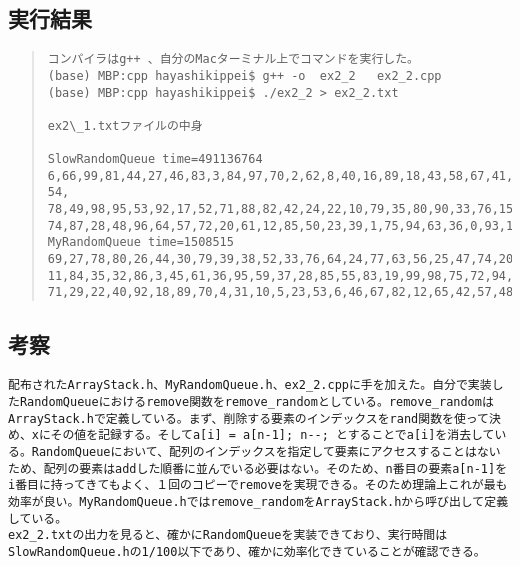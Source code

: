 \documentclass[11pt,a4paper]{jsarticle}
\begin{document}
\subsection{実行結果}
\begin{quote}           %
\begin{verbatim}
コンパイラはg++ 、自分のMacターミナル上でコマンドを実行した。
(base) MBP:cpp hayashikippei$ g++ -o  ex2_2   ex2_2.cpp
(base) MBP:cpp hayashikippei$ ./ex2_2 > ex2_2.txt

ex2\_1.txtファイルの中身

SlowRandomQueue time=491136764
6,66,99,81,44,27,46,83,3,84,97,70,2,62,8,40,16,89,18,43,58,67,41,68,7,91,25,13,59,56,9,4,29,60,77,
54,
78,49,98,95,53,92,17,52,71,88,82,42,24,22,10,79,35,80,90,33,76,15,37,5,21,26,55,47,65,45,14,73,
74,87,28,48,96,64,57,72,20,61,12,85,50,23,39,1,75,94,63,36,0,93,19,32,69,11,38,86,30,51,31,34,
MyRandomQueue time=1508515
69,27,78,80,26,44,30,79,39,38,52,33,76,64,24,77,63,56,25,47,74,20,62,60,34,17,9,91,43,16,0,41,90,
11,84,35,32,86,3,45,61,36,95,59,37,28,85,55,83,19,99,98,75,72,94,2,93,66,73,21,14,96,54,13,15,68,
71,29,22,40,92,18,89,70,4,31,10,5,23,53,6,46,67,82,12,65,42,57,48,97,58,1,51,88,81,87,50,8,49,7,

\end{verbatim}
\end{quote}
%
\subsection{考察}
\begin{verbatim}
配布されたArrayStack.h、MyRandomQueue.h、ex2_2.cppに手を加えた。自分で実装したRandomQueueにおけるremove関数をremove_randomとしている。remove_randomはArrayStack.hで定義している。まず、削除する要素のインデックスをrand関数を使って決め、xにその値を記録する。そしてa[i] = a[n-1]; n--; とすることでa[i]を消去している。RandomQueueにおいて、配列のインデックスを指定して要素にアクセスすることはないため、配列の要素はaddした順番に並んでいる必要はない。そのため、n番目の要素a[n-1]をi番目に持ってきてもよく、１回のコピーでremoveを実現できる。そのため理論上これが最も効率が良い。MyRandomQueue.hではremove_randomをArrayStack.hから呼び出して定義している。
ex2_2.txtの出力を見ると、確かにRandomQueueを実装できており、実行時間はSlowRandomQueue.hの1/100以下であり、確かに効率化できていることが確認できる。
\end{verbatim}
%
\end{document}
